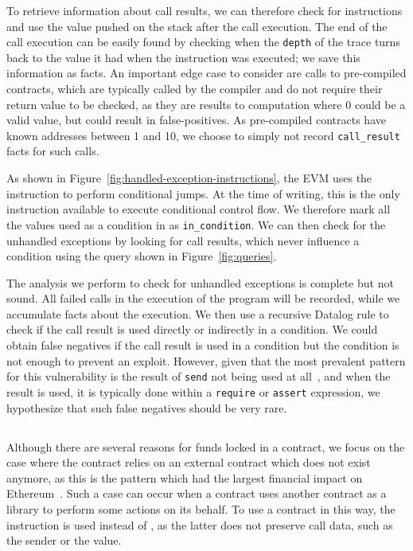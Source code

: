 To retrieve information about call results, we can therefore check for  instructions and use the value pushed on the stack after the call execution. The end of the call execution can be easily found by checking when the \lstinline{depth} of the trace turns back to the value it had when the  instruction was executed; we save this information as  facts.
An important edge case to consider are calls to pre-compiled contracts, which are typically called by the compiler and do not require their return value to be checked, as they are results to computation where $0$ could be a valid value, but could result in false-positives.
As pre-compiled contracts have known addresses between 1 and 10, we choose to simply not record \lstinline{call_result} facts for such calls.

As shown in Figure~\ref{fig:handled-exception-instructions}, the EVM uses the  instruction to perform conditional jumps. At the time of writing, this is the only instruction available to execute conditional control flow. We therefore mark all the values used as a condition in  as \lstinline{in_condition}. We can then check for the unhandled exceptions by looking for call results, which never influence a condition using the query shown in Figure~\ref{fig:queries}.

\correctness The analysis we perform to check for unhandled exceptions is complete but not sound.
All failed calls in the execution of the program will be recorded, while we accumulate facts about the execution.
We then use a recursive Datalog rule to check if the call result is used directly or indirectly in a condition.
We could obtain false negatives if the call result is used in a condition but the condition is not enough to prevent an exploit.
However, given that the most prevalent pattern for this vulnerability is the result of \lstinline{send} not being used at all~\cite{Tsankov2018}, and when the result is used, it is typically done within a \lstinline{require} or \lstinline{assert} expression, we hypothesize that such false negatives should be very rare.

\subsection{\lockedether}
Although there are several reasons for funds locked in a contract, we focus on the case where the contract relies on an external contract which does not exist anymore, as this is the pattern which had the largest financial impact on Ethereum~\cite{Breidenbach}. Such a case can occur when a contract uses another contract as a library to perform some actions on its behalf. To use a contract in this way, the  instruction is used instead of , as the latter does not preserve call data, such as the sender or the value.

